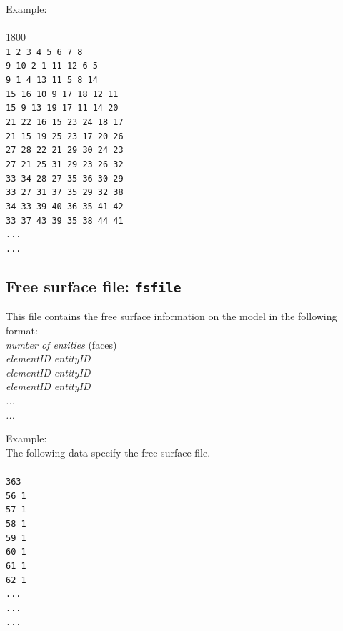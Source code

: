 Example:\\\\
1800\\
\texttt{1 2 3 4 5 6 7 8 \\
9 10 2 1 11 12 6 5 \\
9 1 4 13 11 5 8 14 \\
15 16 10 9 17 18 12 11 \\
15 9 13 19 17 11 14 20 \\
21 22 16 15 23 24 18 17 \\
21 15 19 25 23 17 20 26 \\
27 28 22 21 29 30 24 23 \\
27 21 25 31 29 23 26 32 \\
33 34 28 27 35 36 30 29 \\
33 27 31 37 35 29 32 38 \\
34 33 39 40 36 35 41 42 \\
33 37 43 39 35 38 44 41 \\
...\\
...\\}

\subsection{Free surface file: \texttt{fsfile}}

This file contains the free surface information on the model in the following format:\\

\emph{number of entities} (faces)\\
\emph{elementID entityID \\
elementID entityID \\
elementID entityID \\
...\\
...\\}

Example:\\
The following data specify the free surface file.\\\\

\texttt{363\\
56 1\\
57 1\\
58 1\\
59 1\\
60 1\\
61 1\\
62 1\\
...\\
...\\
...}\\

